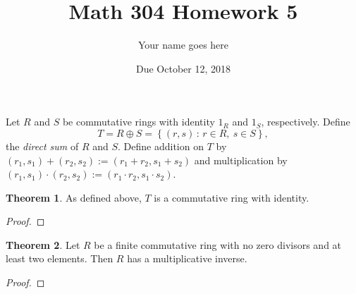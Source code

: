 \documentclass[11pt]{article}		%
\title{Math 304 Homework 5}
\author{Your name goes here}
\date{Due October 12, 2018}
\theoremstyle{definition}
\newtheorem{theorem}{Theorem}
\def\setof#1#2{{\left\{#1\,\colon\,#2\right\}}}
\begin{document}
\maketitle


 Let $R$ and $S$ be commutative rings with identity $1_R$ and $1_S$, respectively. 
 Define
	\[
		T = R\oplus S = \setof{(r,s)}{r\in R,\ s\in S},
	\]
	the \emph{direct sum} of $R$ and $S$.
	Define addition on $T$ by $(r_1,s_1) + (r_2,s_2) := (r_1 + r_2, s_1 + s_2)$ and multiplication by $(r_1,s_1) \cdot (r_2,s_2) := (r_1 \cdot r_2, s_1 \cdot s_2)$. 
	
	\begin{theorem}
		As defined above, $T$ is a commutative ring with identity.
	\end{theorem}

	\begin{proof}
		
	\end{proof}
	
	
	
	
	
	\begin{theorem}
		Let $R$ be a finite commutative ring with no zero divisors and at least two elements.
		Then $R$ has a multiplicative inverse.
	\end{theorem}
	
	\begin{proof}
		
	\end{proof}
\end{document}
